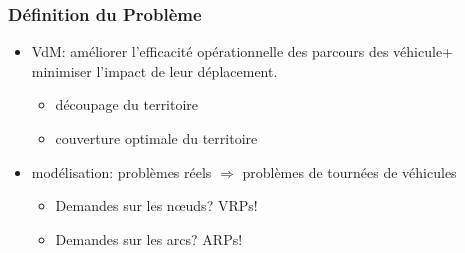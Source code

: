 \documentclass[french]{beamer}
\begin{document}
\begin{frame}
\frametitle{Définition du Problème}

	\begin{itemize}
		\item VdM: améliorer l'efficacité opérationnelle des parcours des véhicule+ minimiser l'impact de leur déplacement. 
			\begin{itemize}
				\item découpage du territoire
				\item couverture optimale du territoire
			\end{itemize}
		\item modélisation: problèmes réels $\Longrightarrow$ problèmes de tournées de véhicules
			\begin{itemize}
				\item Demandes sur les nœuds? VRPs!
				\item Demandes sur les arcs? ARPs!
			\end{itemize}
	\end{itemize}



\end{frame}

\end{document}
